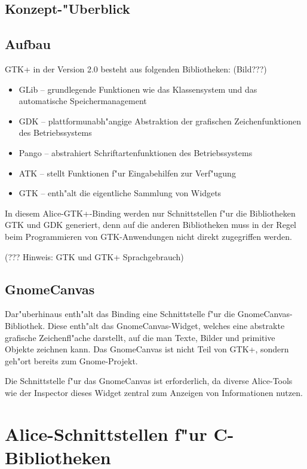 \documentclass{article}
\begin{document}
\subsection{Konzept-"Uberblick}

\subsection{Aufbau}

GTK+ in der Version 2.0 besteht aus folgenden Bibliotheken: (Bild???)

\begin{itemize}
\item GLib -- grundlegende Funktionen wie das Klassensystem und
      das automatische Speichermanagement
\item GDK -- plattformunabh"angige Abstraktion der grafischen
      Zeichenfunktionen des Betriebssystems
\item Pango -- abstrahiert Schriftartenfunktionen des Betriebssystems
\item ATK -- stellt Funktionen f"ur Eingabehilfen zur Verf"ugung
\item GTK -- enth"alt die eigentliche Sammlung von Widgets
\end{itemize}

In diesem Alice-GTK+-Binding werden nur Schnittstellen f"ur die Bibliotheken
GTK und GDK generiert, denn auf die anderen Bibliotheken muss in der Regel beim
Programmieren von GTK-Anwendungen nicht direkt zugegriffen werden.

(??? Hinweis: GTK und GTK+ Sprachgebrauch)

\subsection{GnomeCanvas}

Dar"uberhinaus enth"alt das Binding eine Schnittstelle f"ur die GnomeCanvas-
Bibliothek. Diese enth"alt das GnomeCanvas-Widget, welches eine abstrakte
grafische Zeichenfl"ache darstellt, auf die man Texte, Bilder und primitive
Objekte zeichnen kann. Das GnomeCanvas ist nicht Teil von GTK+, sondern
geh"ort bereits zum Gnome-Projekt.

Die Schnittstelle f"ur das GnomeCanvas ist erforderlich, da diverse Alice-Tools
wie der Inspector dieses Widget zentral zum Anzeigen von Informationen
nutzen.

\section{Alice-Schnittstellen f"ur C-Bibliotheken}
\end{document}
